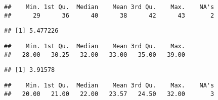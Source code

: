 \documentclass[]{article}
\newenvironment{Shaded}{\begin{snugshade}}{\end{snugshade}}
\newcommand{\KeywordTok}[1]{\textcolor[rgb]{0.13,0.29,0.53}{\textbf{#1}}}
\newcommand{\DataTypeTok}[1]{\textcolor[rgb]{0.13,0.29,0.53}{#1}}
\newcommand{\OperatorTok}[1]{\textcolor[rgb]{0.81,0.36,0.00}{\textbf{#1}}}
\newcommand{\NormalTok}[1]{#1}
\begin{document}
\begin{verbatim}
##    Min. 1st Qu.  Median    Mean 3rd Qu.    Max.    NA's 
##      29      36      40      38      42      43       2
\end{verbatim}

\begin{Shaded}
\end{Shaded}

\begin{verbatim}
## [1] 5.477226
\end{verbatim}

\begin{Shaded}
\end{Shaded}

\begin{verbatim}
##    Min. 1st Qu.  Median    Mean 3rd Qu.    Max. 
##   28.00   30.25   32.00   33.00   35.00   39.00
\end{verbatim}

\begin{Shaded}
\end{Shaded}

\begin{verbatim}
## [1] 3.91578
\end{verbatim}

\begin{Shaded}
\end{Shaded}

\begin{verbatim}
##    Min. 1st Qu.  Median    Mean 3rd Qu.    Max.    NA's 
##   20.00   21.00   22.00   23.57   24.50   32.00       3
\end{verbatim}

\begin{Shaded}
\end{Shaded}
\end{document}
